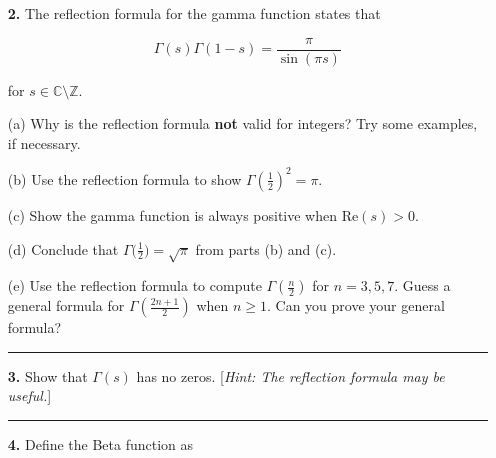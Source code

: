\documentclass[12pt]{amsart}
\theoremstyle{definition}
\theoremstyle{remark}
\numberwithin{equation}{section}
\def\C{\mathbb C}
\def\Z{{\mathbb Z}}
\def\C{\mathbb{C}}
\def\Z{\mathbb{Z}}
\begin{document}
\begin{itemize}
    \vspace{4mm}

\item[\textbf{2.}] The reflection formula for the gamma function states that 

$$\Gamma(s)\Gamma(1-s) = \frac{\pi}{\sin(\pi s)}$$

for $s \in \C \setminus \Z$.
    \vspace{4mm}

    \item[(a)] Why is the reflection formula \textbf{not} valid for integers? Try some examples, if necessary.

    \vspace{4mm}

    \item[(b)] Use the reflection formula to show $\Gamma(\frac{1}{2})^{2} = \pi$. 

    \vspace{4mm}

    \item[(c)] Show the gamma function is always positive when $\text{Re}(s) > 0$.

    \vspace{4mm}

    \item[(d)] Conclude that $\Gamma \big(\frac{1}{2}\big) = \sqrt{\pi}$ from parts (b) and (c).

    \vspace{4mm}

    \item[(e)] Use the reflection formula to compute $\Gamma(\frac{n}{2})$ for $n=3,5,7$. Guess a general formula for $\Gamma(\frac{2n+1}{2})$ when $n \geq 1$. Can you prove your general formula?

    \vspace{4mm}

    \hrule{}

    \vspace{8mm}

\item[\textbf{3.}] Show that $\Gamma(s)$ has no zeros. [\textit{Hint: The reflection formula may be useful.}]

\vspace{4mm}

\hrule{}

\vspace{8mm}

\item[\textbf{4.}] Define the Beta function as 


\end{itemize}
\end{document}
